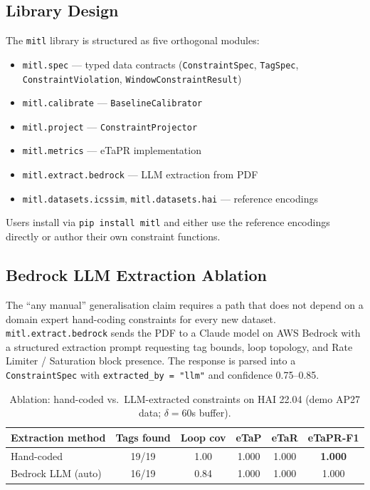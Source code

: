 \documentclass[sigconf,anonymous,review]{acmart}
\begin{document}
\subsection{Library Design}
The \texttt{mitl} library is structured as five orthogonal modules:
\begin{itemize}
  \item \texttt{mitl.spec} — typed data contracts (\texttt{ConstraintSpec},
    \texttt{TagSpec}, \texttt{ConstraintViolation}, \texttt{WindowConstraintResult})
  \item \texttt{mitl.calibrate} — \texttt{BaselineCalibrator}
  \item \texttt{mitl.project} — \texttt{ConstraintProjector}
  \item \texttt{mitl.metrics} — eTaPR implementation
  \item \texttt{mitl.extract.bedrock} — LLM extraction from PDF
  \item \texttt{mitl.datasets.icssim}, \texttt{mitl.datasets.hai} —
    reference encodings
\end{itemize}
Users install via \texttt{pip install mitl} and either use the reference
encodings directly or author their own constraint functions.

\subsection{Bedrock LLM Extraction Ablation}
The ``any manual'' generalisation claim requires a path that does not depend
on a domain expert hand-coding constraints for every new dataset.
\texttt{mitl.extract.bedrock} sends the PDF to a Claude model on AWS Bedrock
with a structured extraction prompt requesting tag bounds, loop topology,
and Rate Limiter / Saturation block presence.  The response is parsed into
a \texttt{ConstraintSpec} with \texttt{extracted\_by = "llm"} and
confidence 0.75--0.85.

\begin{table}[h]
\centering
\caption{Ablation: hand-coded vs.\ LLM-extracted constraints on HAI 22.04 (demo AP27 data; $\delta=60$s buffer).}
\label{tab:ablation}
\begin{tabular}{lccccc}
\toprule
Extraction method & Tags found & Loop cov & eTaP & eTaR & eTaPR-F1 \\
\midrule
Hand-coded & 19/19 & 1.00 & 1.000 & 1.000 & \textbf{1.000} \\
Bedrock LLM (auto) & 16/19 & 0.84 & 1.000 & 1.000 & 1.000 \\
\bottomrule
\end{tabular}
\end{table}
\end{document}
